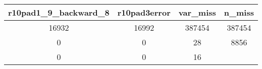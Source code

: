 \documentclass[]{book}
\begin{document}
\begin{longtable}[]{@{}cccc@{}}
\toprule
\begin{minipage}[b]{0.28\columnwidth}\centering\strut
r10pad1\_9\_backward\_8\strut
\end{minipage} & \begin{minipage}[b]{0.18\columnwidth}\centering\strut
r10pad3error\strut
\end{minipage} & \begin{minipage}[b]{0.14\columnwidth}\centering\strut
var\_miss\strut
\end{minipage} & \begin{minipage}[b]{0.10\columnwidth}\centering\strut
n\_miss\strut
\end{minipage}\tabularnewline
\midrule
\endhead
\begin{minipage}[t]{0.28\columnwidth}\centering\strut
16932\strut
\end{minipage} & \begin{minipage}[t]{0.18\columnwidth}\centering\strut
16992\strut
\end{minipage} & \begin{minipage}[t]{0.14\columnwidth}\centering\strut
387454\strut
\end{minipage} & \begin{minipage}[t]{0.10\columnwidth}\centering\strut
387454\strut
\end{minipage}\tabularnewline
\begin{minipage}[t]{0.28\columnwidth}\centering\strut
0\strut
\end{minipage} & \begin{minipage}[t]{0.18\columnwidth}\centering\strut
0\strut
\end{minipage} & \begin{minipage}[t]{0.14\columnwidth}\centering\strut
28\strut
\end{minipage} & \begin{minipage}[t]{0.10\columnwidth}\centering\strut
8856\strut
\end{minipage}\tabularnewline
\begin{minipage}[t]{0.28\columnwidth}\centering\strut
0\strut
\end{minipage} & \begin{minipage}[t]{0.18\columnwidth}\centering\strut
0\strut
\end{minipage} & \begin{minipage}[t]{0.14\columnwidth}\centering\strut
16\strut
\end{minipage} & \begin{minipage}[t]{0.10\columnwidth}\centering\strut

\end{minipage}
\end{longtable}
\end{document}
